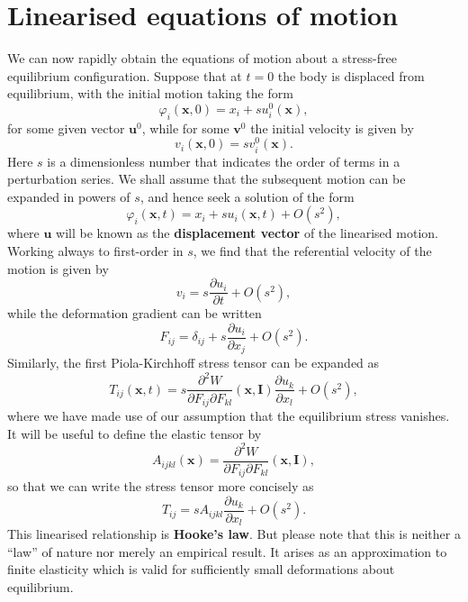 \documentclass [a4paper,12pt]{paper}
\begin{document}
\section*{Linearised equations of motion}

We can now rapidly obtain the equations of motion about a stress-free equilibrium configuration. Suppose that at $t = 0$ the 
body is displaced from equilibrium, with the initial motion taking the form
\begin{equation}
\varphi_{i}(\mathbf{x}, 0) = x_{i} + s u_{i}^{0}(\mathbf{x}),
\end{equation}
for some given vector $\mathbf{u}^{0}$, while for some $\mathbf{v}^{0}$ the initial velocity is given by
\begin{equation}
v_{i}(\mathbf{x}, 0) = s v_{i}^{0}(\mathbf{x}).
\end{equation}
Here $s$ is a dimensionless number that indicates the order of terms in a perturbation series. We shall assume that the 
subsequent motion can be expanded in powers of $s$, and hence seek a solution of the form
\begin{equation}
\varphi_{i}(\mathbf{x}, t) = x_{i} + s u_{i}(\mathbf{x}, t) + O(s^2),
\end{equation}
where $\mathbf{u}$ will be known as the \textbf{displacement vector} of the linearised motion. Working always to first-order 
in $s$, we find that the referential velocity of the motion is given by
\begin{equation}
v_{i} = s\frac{\partial u_{i}}{\partial t} + O(s^2),
\end{equation}
while the deformation gradient can be written
\begin{equation}
F_{ij} = \delta_{ij} + s\frac{\partial u_{i}}{\partial x_{j}} + O(s^2).
\end{equation}
Similarly, the first Piola-Kirchhoff stress tensor can be expanded as
\begin{equation}
T_{ij}(\mathbf{x}, t) = s\frac{\partial^2 W}{\partial F_{ij}\partial F_{kl}}(\mathbf{x}, \mathbf{I})\frac{\partial u_{k}}{\partial x_{l}} + O(s^2),
\end{equation}
where we have made use of our assumption that the equilibrium stress vanishes. It will be useful to define the elastic tensor by
\begin{equation}
A_{ijkl}(\mathbf{x}) = \frac{\partial^2 W}{\partial F_{ij}\partial F_{kl}}(\mathbf{x}, \mathbf{I}),
\end{equation}
so that we can write the stress tensor more concisely as
\begin{equation}
T_{ij} = s A_{ijkl}\frac{\partial u_{k}}{\partial x_{l}} + O(s^2).
\end{equation}
This linearised relationship is \textbf{Hooke's law}. But please note that this is neither a ``law'' of nature nor merely an
empirical result. It arises as an approximation to finite elasticity which is valid for sufficiently small 
deformations about equilibrium.
\end{document}
